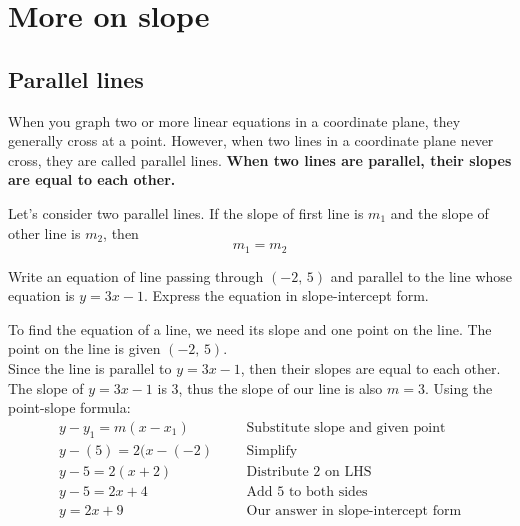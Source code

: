 \chapter{More on slope}
\section{Parallel lines}
When you graph two or more linear equations in a coordinate plane, they generally cross at a point. However, when two lines in a coordinate plane never cross, they are called parallel lines. 	\textbf{When two lines are parallel, their slopes are equal to each other.}
\begin{tcolorbox}[
                    title=Parallel lines,
                    fonttitle=\bfseries
                    colframe=blue!70!red,
                    colback=white
                    ]
	Let's consider two parallel lines. If the slope of first line is $m_1$ and the slope of other line is $m_2$, then 
    	\begin{equation}
    		m_1=m_2	\label{parallel}
    	\end{equation}
    \begin{center}
    \end{center}
\end{tcolorbox}
\begin{exa}
	Write an equation of line passing through $(-2,\,5)$ and parallel to the line whose equation is $y=3x-1$. Express the equation in slope-intercept form.
\end{exa}

To find the equation of a line, we need its slope and one point on the line. The point on the line is given $(-2,\,5)$.\\
Since the line is parallel to $y=3x-1$, then their slopes are equal to each other. The slope of $y=3x-1$ is 3, thus the slope of our line is also $m=3$. Using the point-slope formula:
\begin{align*}
        y-y_1=m(x-x_1)& &   &\text{Substitute slope and given point}\\
        y-(5)=2(x-(-2)& &   &\text{Simplify}\\
        y-5 = 2(x+2)&   &   &\text{Distribute 2 on LHS}\\
        y -5 = 2x+4&    &   &\text{Add 5 to both sides}\\
        y = 2x+9&   &   &\text{Our answer in slope-intercept form}
\end{align*}

